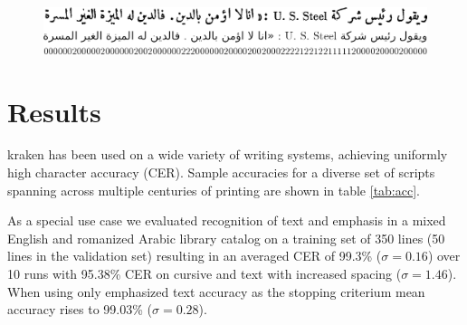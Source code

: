 \begin{figure}[h]
        \includegraphics[width=\linewidth]{transcription.png}
        \centering
        \label{fig:transcription}
\end{figure}

\section{Results}

kraken has been used on a wide variety of writing systems, achieving uniformly
high character accuracy (CER). Sample accuracies for a diverse set of scripts
spanning across multiple centuries of printing are shown in table \ref{tab:acc}. 

As a special use case we evaluated recognition of text and emphasis in a mixed
English and romanized Arabic library catalog on a training set of 350 lines (50
lines in the validation set) resulting in an averaged CER  of 99.3\%
($\sigma=0.16$) over 10 runs with 95.38\% CER on cursive and text with
increased spacing ($\sigma=1.46$). When using only emphasized text accuracy as
the stopping criterium mean accuracy rises to 99.03\% ($\sigma=0.28$).

